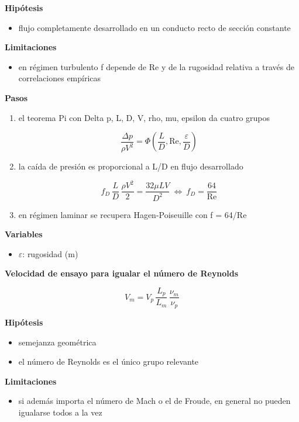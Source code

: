 \documentclass[10pt,openany]{book}
\begin{document}
\begin{tcolorbox}[title={Desarrollos del modelo}, studiumdef, breakable]
\noindent\textbf{Hipótesis}
\begin{itemize}
\item flujo completamente desarrollado en un conducto recto de sección constante
\end{itemize}

\noindent\textbf{Limitaciones}
\begin{itemize}
\item en régimen turbulento f depende de Re y de la rugosidad relativa a través de correlaciones empíricas
\end{itemize}

\noindent\textbf{Pasos}
\begin{enumerate}
\item
el teorema Pi con Delta p, L, D, V, rho, mu, epsilon da cuatro grupos

\[
\frac{\Delta p}{\rho V^{2}} = \Phi\!\left(\frac{L}{D}, \mathrm{Re}, \frac{\varepsilon}{D}\right)
\]
\item
la caída de presión es proporcional a L/D en flujo desarrollado

\[
f_D\,\frac{L}{D}\,\frac{\rho V^{2}}{2} = \frac{32\mu L V}{D^{2}}\ \Leftrightarrow\ f_D = \frac{64}{\mathrm{Re}}
\]
\item
en régimen laminar se recupera Hagen-Poiseuille con f = 64/Re
\end{enumerate}

\noindent\textbf{Variables}
\begin{itemize}
\item $\varepsilon$: rugosidad ($\mathrm{m}$)
\end{itemize}



\noindent\textbf{Velocidad de ensayo para igualar el número de Reynolds}

\begin{equation}
V_m = V_p\,\frac{L_p}{L_m}\,\frac{\nu_m}{\nu_p}
\label{eq:c10-semejanza}
\end{equation}

\noindent\textbf{Hipótesis}
\begin{itemize}
\item semejanza geométrica
\item el número de Reynolds es el único grupo relevante
\end{itemize}

\noindent\textbf{Limitaciones}
\begin{itemize}
\item si además importa el número de Mach o el de Froude, en general no pueden igualarse todos a la vez
\end{itemize}


\end{tcolorbox}
\end{document}
